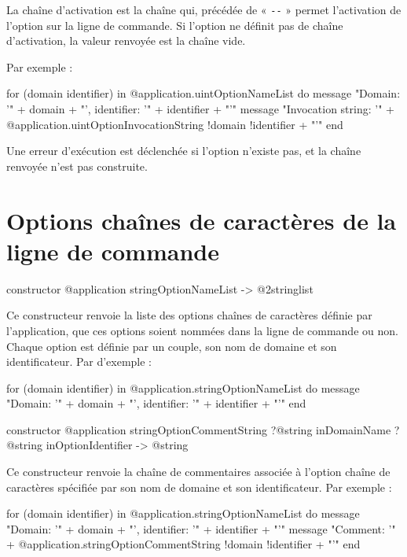 La chaîne d'activation est la chaîne qui, précédée de « \texttt{-{}-} » permet l'activation de l'option sur la ligne de commande. Si l'option ne définit pas de chaîne d'activation, la valeur renvoyée est la chaîne vide.

 Par exemple :
\begin{galgas}
for (domain identifier) in @application.uintOptionNameList do
  message "Domain: '" + domain + "', identifier: '" + identifier + "'\n"
  message "Invocation string: '"
    + @application.uintOptionInvocationString {!domain !identifier} + "'\n"
end
\end{galgas}

Une erreur d'exécution est déclenchée si l'option n'existe pas, et la chaîne renvoyée n'est pas construite.












\section{Options chaînes de caractères de la ligne de commande}


\begin{galgasbox}
constructor @application stringOptionNameList -> @2stringlist
\end{galgasbox}

Ce constructeur renvoie la liste des options chaînes de caractères définie par l'application, que ces options soient nommées dans la ligne de commande ou non. Chaque option est définie par un couple, son nom de domaine et son identificateur. Par d'exemple :
\begin{galgas}
for (domain identifier) in @application.stringOptionNameList do
  message "Domain: '" + domain + "', identifier: '" + identifier + "'\n"
end
\end{galgas}



\begin{galgasbox}
constructor @application stringOptionCommentString
    ?@string inDomainName
    ?@string inOptionIdentifier -> @string
\end{galgasbox}

Ce constructeur renvoie la chaîne de commentaires associée à l'option chaîne de caractères spécifiée par son nom de domaine et son identificateur. Par exemple :
\begin{galgas}
for (domain identifier) in @application.stringOptionNameList do
  message "Domain: '" + domain + "', identifier: '" + identifier + "'\n"
  message "Comment: '"
    + @application.stringOptionCommentString {!domain !identifier} + "'\n"
end
\end{galgas}

